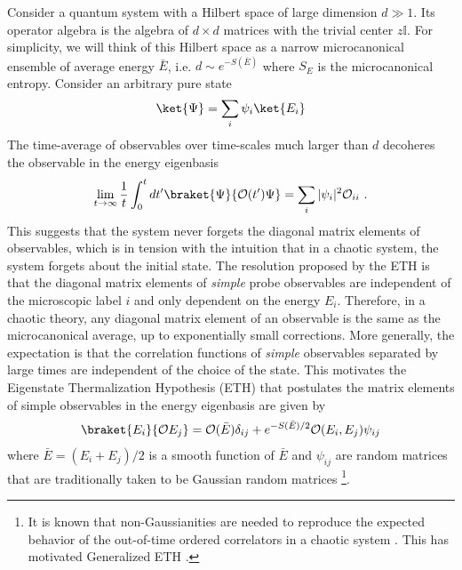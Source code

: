 \documentclass[a4paper,11pt]{article}
\theoremstyle{definition}
\numberwithin{equation}{section}
\newcommand{\mO}{\mathcal{O}}
\begin{document}
Consider a quantum system with a Hilbert space of large dimension $d\gg 1$. Its operator algebra is the algebra of $d\times d$ matrices with the trivial center $z\mathbb{I}$. For simplicity, we will think of this Hilbert space as a narrow microcanonical ensemble of average energy $\bar{E}$, i.e. $d\sim e^{-S(\bar{E})}$ where $S_E$ is the microcanonical entropy. Consider an arbitrary pure state 
\begin{eqnarray}
    \ket{\Psi}=\sum_i \psi_i \ket{E_i}
\end{eqnarray}
The time-average of observables over time-scales much larger than $d$ decoheres the observable in the energy eigenbasis
\begin{eqnarray}
    \lim_{t\to \infty}\frac{1}{t}\int_0^t dt'\braket{\Psi}{\mO(t'
    )\Psi}=\sum_i |\psi_i|^2 \mO_{ii}\ .
\end{eqnarray}
This suggests that the system never forgets the diagonal matrix elements of observables, which is in tension with the intuition that in a chaotic system, the system forgets about the initial state. The resolution proposed by the ETH is that the diagonal matrix elements of {\it simple} probe observables are independent of the microscopic label $i$ and only dependent on the energy $E_i$. Therefore, in a chaotic theory, any diagonal matrix element of an observable is the same as the microcanonical average, up to exponentially small corrections. More generally, the expectation is that the correlation functions of {\it simple} observables separated by large times are independent of the choice of the state. This motivates the Eigenstate Thermalization Hypothesis (ETH) that postulates the matrix elements of simple observables in the energy eigenbasis are given by
\begin{eqnarray}\label{ETH}
    \braket{E_i}{\mO E_j}=\mO(\bar{E})\delta_{ij}+e^{-S(\bar{E})/2}\mO(E_i,E_j)\psi_{ij}
\end{eqnarray}
where $\bar{E}=(E_i+E_j)/2$ is a smooth function of $\bar{E}$ and $\psi_{ij}$ are random matrices that are traditionally taken to be Gaussian random matrices \footnote{It is known that non-Gaussianities are needed to reproduce the expected behavior of the out-of-time ordered correlators in a chaotic system \cite{foini2019eigenstate,jafferis2023matrix}. This has motivated Generalized ETH \cite{foini2019eigenstate,pappalardi2022eigenstate}.}. 
\end{document}
